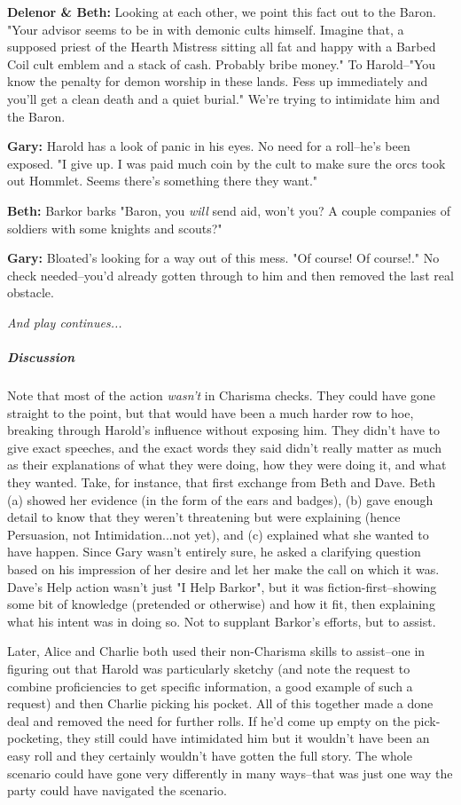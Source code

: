 \textbf{Delenor & Beth:} Looking at each other, we point this fact out to the Baron. "Your advisor seems to be in with demonic cults himself. Imagine that, a supposed priest of the Hearth Mistress sitting all fat and happy with a Barbed Coil cult emblem and a stack of cash. Probably bribe money." To Harold--"You know the penalty for demon worship in these lands. Fess up immediately and you'll get a clean death and a quiet burial." We're trying to intimidate him and the Baron.

\textbf{Gary:} Harold has a look of panic in his eyes. No need for a roll--he's been exposed. "I give up. I was paid much coin by the cult to make sure the orcs took out Hommlet. Seems there's something there they want."

\textbf{Beth:} Barkor barks "Baron, you \textit{will} send aid, won't you? A couple companies of soldiers with some knights and scouts?"

\textbf{Gary:} Bloated's looking for a way out of this mess. "Of course! Of course!." No check needed--you'd already gotten through to him and then removed the last real obstacle.

\textit{And play continues...}

\subparagraph*{Discussion} Note that most of the action \textit{wasn't} in Charisma checks. They could have gone straight to the point, but that would have been a much harder row to hoe, breaking through Harold's influence without exposing him. They didn't have to give exact speeches, and the exact words they said didn't really matter as much as their explanations of what they were doing, how they were doing it, and what they wanted. Take, for instance, that first exchange from Beth and Dave. Beth (a) showed her evidence (in the form of the ears and badges), (b) gave enough detail to know that they weren't threatening but were explaining (hence Persuasion, not Intimidation...not yet), and (c) explained what she wanted to have happen. Since Gary wasn't entirely sure, he asked a clarifying question based on his impression of her desire and let her make the call on which it was. Dave's Help action wasn't just "I Help Barkor", but it was fiction-first--showing some bit of knowledge (pretended or otherwise) and how it fit, then explaining what his intent was in doing so. Not to supplant Barkor's efforts, but to assist.

Later, Alice and Charlie both used their non-Charisma skills to assist--one in figuring out that Harold was particularly sketchy (and note the request to combine proficiencies to get specific information, a good example of such a request) and then Charlie picking his pocket. All of this together made a done deal and removed the need for further rolls. If he'd come up empty on the pick-pocketing, they still could have intimidated him but it wouldn't have been an easy roll and they certainly wouldn't have gotten the full story. The whole scenario could have gone very differently in many ways--that was just one way the party could have navigated the scenario.

